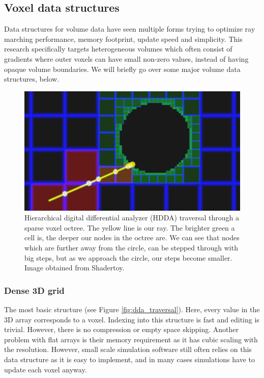 \subsection{Voxel data structures} \label{related_work:voxel_data_structures}
Data structures for volume data have seen multiple forms trying to optimize ray marching performance, memory footprint, update speed and simplicity. This research specifically targets heterogeneous volumes which often consist of gradients where outer voxels can have small non-zero values, instead of having opaque volume boundaries. We will briefly go over some major volume data structures, below.

\begin{figure}
    \centering
    \includegraphics[width=\linewidth]{figures/esvo_traversal.png}
    \caption{Hierarchical digital differential analyzer (HDDA) traversal through a sparse voxel octree. The yellow line is our ray. The brighter green a cell is, the deeper our nodes in the octree are. We can see that nodes which are further away from the circle, can be stepped through with big steps, but as we approach the circle, our steps become smaller. Image obtained from Shadertoy.}
    \label{fig:esvo}
\end{figure}

\subsubsection{Dense 3D grid} \label{related_work:voxel_data_structures:dense_grid}
The most basic structure (see Figure \ref{fig:dda_traversal}). Here, every value in the 3D array corresponds to a voxel. Indexing into this structure is fast and editing is trivial. However, there is no compression or empty space skipping. Another problem with flat arrays is their memory requirement as it has cubic scaling with the resolution. However, small scale simulation software still often relies on this data structure as it is easy to implement, and in many cases simulations have to update each voxel anyway.



